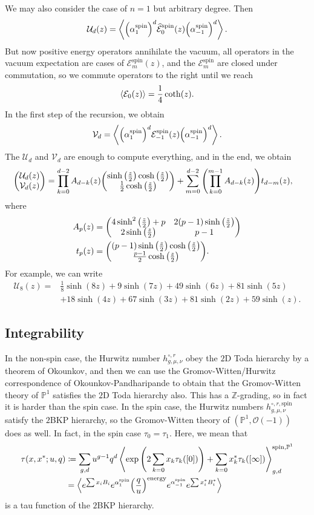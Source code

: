 \documentclass[leqno, openany]{memoir}
\theoremstyle{definition}
\theoremstyle{remark}
\theoremstyle{plain}
\theoremstyle{definition}
\theoremstyle{remark}
\newcommand{\E}{\mathcal{E}}
\newcommand{\Z}{\mathbb{Z}}
\renewcommand{\P}{\mathbb{P}}
\newcommand{\mc}[1]{\mathcal{#1}}
\newcommand{\mr}[1]{\mathrm{#1}}
\newcommand{\wh}[1]{\widehat{#1}}
\begin{document}
We may also consider the case of $n=1$ but arbitrary degree. Then
\[ \mc{U}_d(z) = \ev{\qty(\alpha_1^{\mr{spin}})^d \wh{\mc{E}}_0^{\mr{spin}}(z)\qty(\alpha_{-1}^{\mr{spin}})^d}. \]
But now positive energy operators annihilate the vacuum, all operators in the vacuum expectation are cases of $\E_m^{\mr{spin}}(z)$, and the $\E_m^{\mr{spin}}$ are closed under commutation, so we commute operators to the right until we reach
\[ \ev{\mc{E}_0(z)} = \frac{1}{4} \coth(z). \]
In the first step of the recursion, we obtain
\[ \mc{V}_d = \ev{\qty(\alpha_1^{\mr{spin}})^d \E_{-1}^{\mr{spin}}(z)\qty(\alpha_{-1}^{\mr{spin}})^d}. \]
The $\mc{U}_d$ and $\mc{V}_d$ are enough to compute everything, and in the end, we obtain
\begin{align*}
\mqty(\mc{U}_d(z) \\ \mc{V}_d(z)) &= \prod_{k=0}^{d-2} A_{d-k}(z) \mqty(\sinh\qty(\frac{z}{2})\cosh\qty(\frac{z}{2}) \\ \frac{1}{2} \cosh\qty(\frac{z}{2})) + \sum_{m=0}^{d-2} \qty(\prod_{k=0}^{m-1} A_{d-k}(z)) t_{d-m}(z),
\end{align*}
where
\begin{align*}
  A_p(z) &= \mqty(4\sinh^2\qty(\frac{z}{2}) + p & 2(p-1)\sinh\qty(\frac{z}{2}) \\ 2\sinh\qty(\frac{z}{2}) & p-1) \\
  t_p(z) &= \mqty((p-1) \sinh\qty(\frac{z}{2})\cosh\qty(\frac{z}{2}) \\ \frac{p-1}{2} \cosh\qty(\frac{z}{2})). 
\end{align*}
For example, we can write
\begin{align*}
  \mc{U}_8(z) ={}& \frac{1}{8} \sinh(8z) + 9\sinh(7z) + 49 \sinh(6z) + 81 \sinh(5z) \\
  &+ 18 \sinh(4z) + 67 \sinh(3z) + 81 \sinh(2z) + 59 \sinh(z).
\end{align*}

\subsection{Integrability}
\label{subsec:integrability}

In the non-spin case, the Hurwitz number $h_{g,\mu, \nu}^{\circ, r}$ obey the $2$D Toda hierarchy by a theorem of Okounkov, and then we can use the Gromov-Witten/Hurwitz correspondence of Okounkov-Pandharipande to obtain that the Gromov-Witten theory of $\P^1$ satisfies the $2$D Toda hierarchy also. This has a $\Z$-grading, so in fact it is harder than the spin case. In the spin case, the Hurwitz numbers $h_{g,\mu,\nu}^{\circ,r,\mr{spin}}$ satisfy the $2$BKP hierarchy, so the Gromov-Witten theory of $(\P^1, \mc{O}(-1))$ does as well. In fact, in the spin case $\tau_0 = \tau_1$. Here, we mean that
\begin{align*}
  \tau(x, x^*; u,q) &\coloneqq \sum_{g,d} u^{g-1}q^d \ev{\exp\qty(2\sum_{k=0} x_k \tau_k([0])) + \sum_{k=0} x_k^* \tau_k([\infty])}_{g,d}^{\mr{spin}, \P^1} \\
  &= \ev{e^{\sum x_i B_i} e^{\alpha_1^{\mr{spin}}} \qty(\frac{q}{u})^{\mr{energy}} e^{\alpha_{-1}^{\mr{spin}}} e^{\sum x_i^* B_i^*}}
\end{align*}
is a tau function of the $2$BKP hierarchy.
\end{document}

